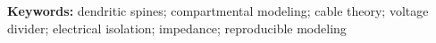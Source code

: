 \newcommand{\spinenatbiboptions}{numbers,sort&compress}
\newcommand{\spinebibstyle}{unsrtnat}
\newif\ifblind
\blindfalse





\spinetitleblock



\noindent\textbf{Keywords:} dendritic spines; compartmental modeling; cable theory; voltage divider; electrical isolation; impedance; reproducible modeling












